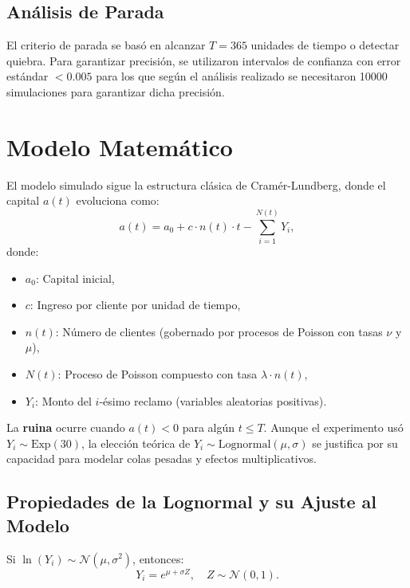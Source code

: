\documentclass{article}
\begin{document}
\subsection{Análisis de Parada}
El criterio de parada se basó en alcanzar \( T = 365 \) unidades de tiempo o detectar quiebra. Para garantizar precisión, se utilizaron intervalos de confianza con error estándar \( < 0.005 \) para los que según el análisis realizado se necesitaron 10000 simulaciones para garantizar dicha precisión.

\section{Modelo Matemático}
El modelo simulado sigue la estructura clásica de Cramér-Lundberg, donde el capital \( a(t) \) evoluciona como:
\begin{equation}
a(t) = a_0 + c \cdot n(t) \cdot t - \sum_{i=1}^{N(t)} Y_i,
\end{equation}
donde:
\begin{itemize}
    \item \( a_0 \): Capital inicial,
    \item \( c \): Ingreso por cliente por unidad de tiempo,
    \item \( n(t) \): Número de clientes (gobernado por procesos de Poisson con tasas \( \nu \) y \( \mu \)),
    \item \( N(t) \): Proceso de Poisson compuesto con tasa \( \lambda \cdot n(t) \),
    \item \( Y_i \): Monto del \( i \)-ésimo reclamo (variables aleatorias positivas).
\end{itemize}

La \textbf{ruina} ocurre cuando \( a(t) < 0 \) para algún \( t \leq T \). Aunque el experimento usó \( Y_i \sim \text{Exp}(30) \), la elección teórica de \( Y_i \sim \text{Lognormal}(\mu, \sigma) \) se justifica por su capacidad para modelar colas pesadas y efectos multiplicativos.

\subsection{Propiedades de la Lognormal y su Ajuste al Modelo}
Si \( \ln(Y_i) \sim \mathcal{N}(\mu, \sigma^2) \), entonces:
\begin{equation}
Y_i = e^{\mu + \sigma Z}, \quad Z \sim \mathcal{N}(0,1).
\end{equation}
\end{document}
